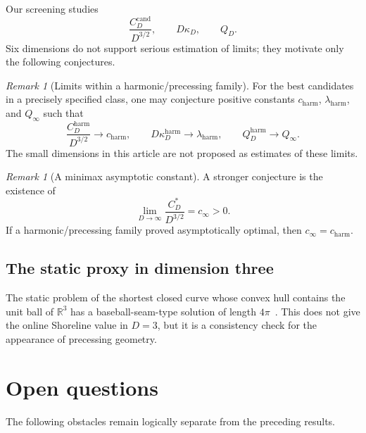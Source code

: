 \documentclass[10pt,a4paper]{article}
\newcommand{\R}{\mathbb{R}}
\newcommand{\ccand}{C^{\mathrm{cand}}}
\newcommand{\cstar}{C^{*}}
\theoremstyle{plain}
\theoremstyle{definition}
\theoremstyle{remark}
\newtheorem{remark}[theorem]{Remark}
\begin{document}
Our screening studies
\[
  \frac{\ccand_D}{D^{3/2}},
  \qquad
  D\kappa_D,
  \qquad
  Q_D.
\]
Six dimensions do not support serious estimation of limits; they motivate only the following conjectures.

\begin{remark}[Limits within a harmonic/precessing family]
For the best candidates in a precisely specified class, one may conjecture positive constants $c_{\mathrm{harm}}$, $\lambda_{\mathrm{harm}}$, and $Q_\infty$ such that
\[
  \frac{C_D^{\mathrm{harm}}}{D^{3/2}}\to c_{\mathrm{harm}},
  \qquad
  D\kappa_D^{\mathrm{harm}}\to\lambda_{\mathrm{harm}},
  \qquad
  Q_D^{\mathrm{harm}}\to Q_\infty.
\]
The small dimensions in this article are not proposed as estimates of these limits.
\end{remark}

\begin{remark}[A minimax asymptotic constant]
A stronger conjecture is the existence of
\[
  \lim_{D\to\infty}\frac{\cstar_D}{D^{3/2}}=c_\infty>0.
\]
If a harmonic/precessing family proved asymptotically optimal, then $c_\infty=c_{\mathrm{harm}}$.
\end{remark}

\subsection{The static proxy in dimension three}

The static problem of the shortest closed curve whose convex hull contains the unit ball of $\R^3$ has a baseball-seam-type solution of length $4\pi$~\cite{ghomi-wenk}. This does not give the online Shoreline value in $D=3$, but it is a consistency check for the appearance of precessing geometry.

\section{Open questions}

The following obstacles remain logically separate from the preceding results.
\end{document}

